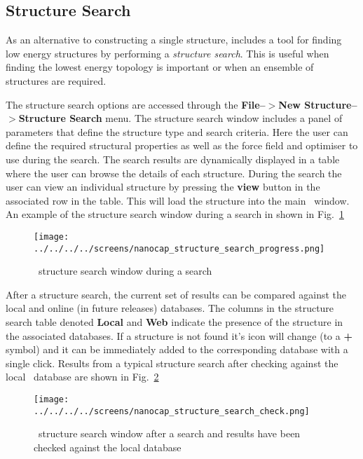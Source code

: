 \subsection{Structure Search}

As an alternative to constructing a single structure, \nanocap includes a tool for finding low energy structures by performing a \textit{structure search}. This is useful when finding the lowest energy topology is important or when an ensemble of structures are required. 

The structure search options are accessed through the \textbf{File--$>$New Structure--$>$Structure Search} menu. The structure search window includes a panel of parameters that define the structure type and search criteria. Here the user can define the required structural properties as well as the force field and optimiser to use during the search. The search results are dynamically displayed in a table where the user can browse the details of each structure. During the search the user can view an individual structure by pressing the \textbf{view} button in the associated row in the table. This will load the structure into the main \nanocap~window. An example of the structure search window during a search in shown in Fig.~\ref{structure_search_progress}

\begin{figure}[h!]
\centering
\texttt{[image: ../../../../screens/nanocap\_structure\_search\_progress.png]}
\caption{\nanocap~structure search window during a search}
\label{structure_search_progress}
\end{figure}

After a structure search, the current set of results can be compared against the local and online (in future releases) databases. The columns in the structure search table denoted \textbf{Local} and \textbf{Web} indicate the presence of the structure in the associated databases. If a structure is not found it's icon will change (to a \textbf{+} symbol) and it can be immediately added to the corresponding database with a single click. Results from a typical structure search after checking against the local \nanocap~database are shown in Fig.~\ref{structure_search_check}

 \begin{figure}[h!]
\centering
\texttt{[image: ../../../../screens/nanocap\_structure\_search\_check.png]}
\caption{\nanocap~structure search window after a search and results have been checked against the local database}
\label{structure_search_check}
\end{figure}
